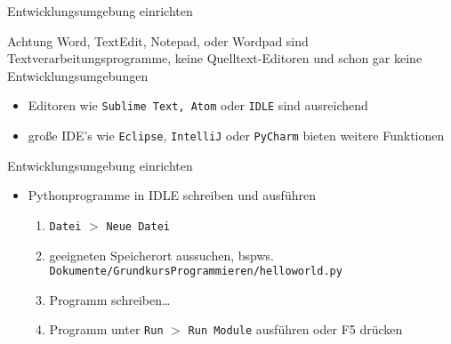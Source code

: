 \begin{frame}{Entwicklungsumgebung einrichten}
    \begin{alertblock}{Achtung}
        Word, TextEdit, Notepad, oder Wordpad sind Textverarbeitungsprogramme, keine 
        Quelltext-Editoren und schon gar keine Entwicklungsumgebungen
    \end{alertblock}
    \pause{}
    \begin{itemize}
        \item Editoren wie \texttt{Sublime Text, Atom} oder \texttt{IDLE} sind 
         ausreichend
        \item große IDE's wie \texttt{Eclipse}, \texttt{IntelliJ} oder \texttt{PyCharm} 
        bieten weitere Funktionen
    \end{itemize}
\end{frame}

\begin{frame}{Entwicklungsumgebung einrichten}
    \begin{itemize}
        \item Pythonprogramme in IDLE schreiben und ausführen
            \begin{enumerate}
                \item\texttt{Datei} $>$ \texttt{Neue Datei}
                \item geeigneten Speicherort aussuchen, bspws. \texttt{Dokumente/GrundkursProgrammieren/helloworld.py}
                \item Programm schreiben\dots
                \item Programm unter \texttt{Run} $>$ \texttt{Run Module} ausführen oder F5 drücken
            \end{enumerate}
    \end{itemize}
\end{frame}

